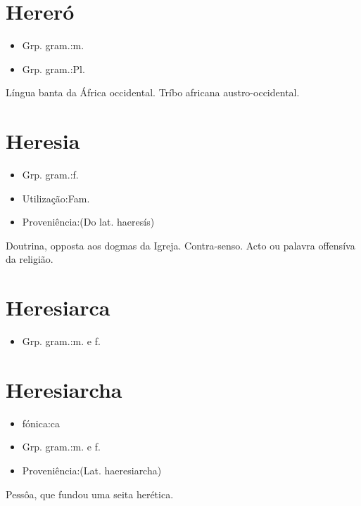 \documentclass{article}
\begin{document}
\section{Hereró}
\begin{itemize}
\item {Grp. gram.:m.}
\end{itemize}
\begin{itemize}
\item {Grp. gram.:Pl.}
\end{itemize}
Língua banta da África occidental.
Tríbo africana austro-occidental.
\section{Heresia}
\begin{itemize}
\item {Grp. gram.:f.}
\end{itemize}
\begin{itemize}
\item {Utilização:Fam.}
\end{itemize}
\begin{itemize}
\item {Proveniência:(Do lat. \textunderscore haeresís\textunderscore )}
\end{itemize}
Doutrina, opposta aos dogmas da Igreja.
Contra-senso.
Acto ou palavra offensíva da religião.
\section{Heresiarca}
\begin{itemize}
\item {Grp. gram.:m.  e  f.}
\end{itemize}

\section{Heresiarcha}
\begin{itemize}
\item {fónica:ca}
\end{itemize}
\begin{itemize}
\item {Grp. gram.:m.  e  f.}
\end{itemize}
\begin{itemize}
\item {Proveniência:(Lat. \textunderscore haeresiarcha\textunderscore )}
\end{itemize}
Pessôa, que fundou uma seita herética.
\end{document}
